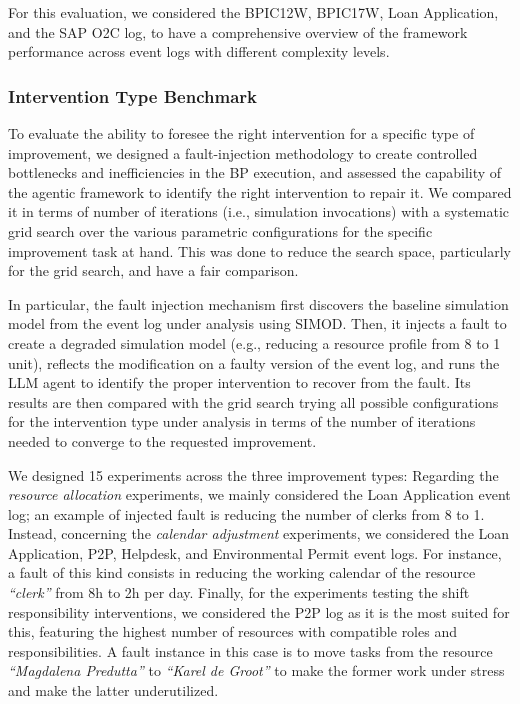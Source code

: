 \documentclass[preprint,12pt]{elsarticle}
\begin{document}
For this evaluation, we considered the BPIC12W, BPIC17W, Loan Application, and the SAP O2C log, to have a comprehensive overview of the framework performance across event logs with different complexity levels.

\subsubsection{Intervention Type Benchmark}
To evaluate the ability to foresee the right intervention for a specific type of improvement, we designed a fault-injection methodology to create controlled bottlenecks and inefficiencies in the BP execution, and assessed the capability of the agentic framework to identify the right intervention to repair it. We compared it in terms of number of iterations (i.e., simulation invocations) with a systematic grid search over the various parametric configurations for the specific improvement task at hand. This was done to reduce the search space, particularly for the grid search, and have a fair comparison.

In particular, the fault injection mechanism first discovers the baseline simulation model from the event log under analysis using SIMOD. Then, it injects a fault to create a degraded simulation model (e.g., reducing a resource profile from 8 to 1 unit), reflects the modification on a faulty version of the event log, and runs the LLM agent to identify the proper intervention to recover from the fault. Its results are then compared with the grid search trying all possible configurations for the intervention type under analysis in terms of the number of iterations needed to converge to the requested improvement.

We designed 15 experiments across the three improvement types:
Regarding the \textit{resource allocation} experiments, we mainly considered the Loan Application event log; an example of injected fault is reducing the number of clerks from 8 to 1.
Instead, concerning the \textit{calendar adjustment} experiments, we considered the Loan Application, P2P, Helpdesk, and Environmental Permit event logs. For instance, a fault of this kind consists in reducing the working calendar of the resource \textit{``clerk''} from 8h to 2h per day.
Finally, for the experiments testing the shift responsibility interventions, we considered the P2P log as it is the most suited for this, featuring the highest number of resources with compatible roles and responsibilities. A fault instance in this case is to move tasks from the resource \textit{``Magdalena Predutta''} to \textit{``Karel de Groot''} to make the former work under stress and make the latter underutilized.
\end{document}
